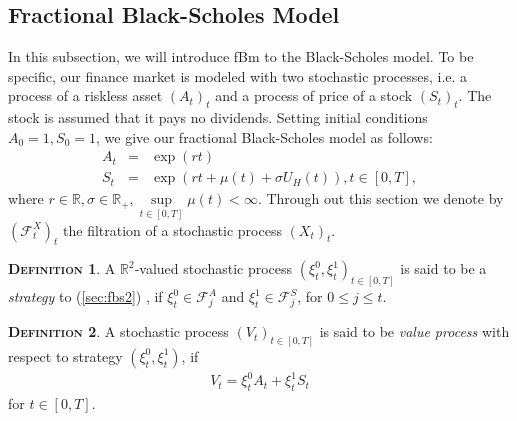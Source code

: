 \documentclass[a4paper, twoside, 11pt]{article}
\theoremstyle{definition}
\newtheorem{definition}{\scshape Definition}[section]
\begin{document}
  \subsection{Fractional Black-Scholes Model}
  In this subsection, we will introduce fBm to the Black-Scholes model. To be specific, our finance market is modeled with two stochastic processes, i.e. a process of a riskless asset $(A_t)_t$ and a process of price of a stock $(S_t)_t$.  The stock is assumed that it pays no dividends. Setting initial conditions $A_0=1, S_0=1$, we give our fractional Black-Scholes model as follows:
  \begin{eqnarray}
	A_t &=& \exp(rt)\nonumber\\
	S_t &=& \exp(rt + \mu(t) +\sigma U_H(t)), t\in [0, T],
	\label{sec:fbs2}
  \end{eqnarray}
  where  $r\in\mathbb{R}, \sigma\in\mathbb{R}_+, \sup\limits_{t\in[0, T]}\mu(t) < \infty$.
   Through out this section we denote by $(\mathcal{F}^X_t)_t$ the filtration of a stochastic process $(X_t)_t$. %

  \begin{definition}
	A $\mathbb{R}^{2}$-valued stochastic process $(\xi_t^0, \xi_t^1)_{t\in [0, T]}$ is said to be a \emph{strategy} to (\ref{sec:fbs2}) , if $\xi_t^0 \in \mathcal{F}^A_{j}$ and $\xi_t^1 \in \mathcal{F}^S_j$, for $0\le j \le t$.
  \end{definition}

  \begin{definition}
	A stochastic process $(V_t)_{t\in[0, T]}$ is said to be \emph{value process} with respect to strategy $(\xi_t^0, \xi_t^1)$, if 
	\begin{eqnarray*}
	  V_t =  \xi^0_t A_t + \xi^1_t S_t %
	\end{eqnarray*}
	for $t \in [0, T]$.
  \end{definition}

\end{document}
